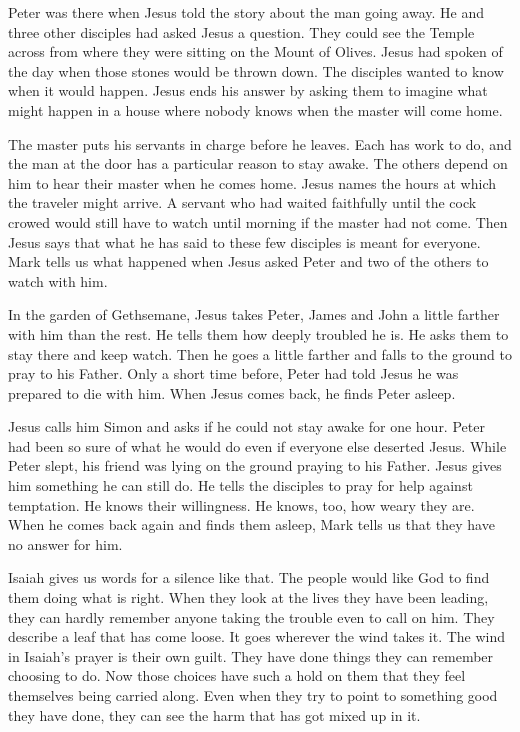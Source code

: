 Peter was there when Jesus told the story about the man going away. He and three other disciples had asked Jesus a question. They could see the Temple across from where they were sitting on the Mount of Olives. Jesus had spoken of the day when those stones would be thrown down. The disciples wanted to know when it would happen. Jesus ends his answer by asking them to imagine what might happen in a house where nobody knows when the master will come home.

The master puts his servants in charge before he leaves. Each has work to do, and the man at the door has a particular reason to stay awake. The others depend on him to hear their master when he comes home. Jesus names the hours at which the traveler might arrive. A servant who had waited faithfully until the cock crowed would still have to watch until morning if the master had not come. Then Jesus says that what he has said to these few disciples is meant for everyone. Mark tells us what happened when Jesus asked Peter and two of the others to watch with him.

In the garden of Gethsemane, Jesus takes Peter, James and John a little farther with him than the rest. He tells them how deeply troubled he is. He asks them to stay there and keep watch. Then he goes a little farther and falls to the ground to pray to his Father. Only a short time before, Peter had told Jesus he was prepared to die with him. When Jesus comes back, he finds Peter asleep.

Jesus calls him Simon and asks if he could not stay awake for one hour. Peter had been so sure of what he would do even if everyone else deserted Jesus. While Peter slept, his friend was lying on the ground praying to his Father. Jesus gives him something he can still do. He tells the disciples to pray for help against temptation. He knows their willingness. He knows, too, how weary they are. When he comes back again and finds them asleep, Mark tells us that they have no answer for him.

Isaiah gives us words for a silence like that. The people would like God to find them doing what is right. When they look at the lives they have been leading, they can hardly remember anyone taking the trouble even to call on him. They describe a leaf that has come loose. It goes wherever the wind takes it. The wind in Isaiah's prayer is their own guilt. They have done things they can remember choosing to do. Now those choices have such a hold on them that they feel themselves being carried along. Even when they try to point to something good they have done, they can see the harm that has got mixed up in it.

